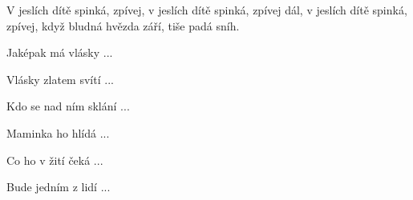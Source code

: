 \IncludeLilypond

V jeslích dítě spinká, zpívej,
v jeslích dítě spinká, zpívej dál,
v jeslích dítě spinká, zpívej,
když bludná hvězda září, tiše padá sníh.

Jaképak má vlásky ...

Vlásky zlatem svítí ...

Kdo se nad ním sklání ...

Maminka ho hlídá ...

Co ho v žití čeká ...

Bude jedním z lidí ...
